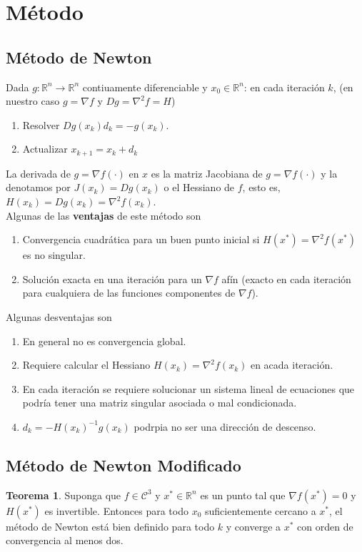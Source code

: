 \documentclass[11pt,letterpaper]{article}
\theoremstyle{definition}
\theoremstyle{definition}
\newtheorem{teo}{Teorema}[section]%
\theoremstyle{definition}
\begin{document}
\section{Método}
\subsection{Método de Newton}
Dada $ g: \mathbb{R}^n \to \mathbb{R}^n $ contiuamente diferenciable y $ x_0\in \mathbb{R}^n $: en cada iteración $ k $, (en nuestro caso $ g = \nabla f $ y $ Dg = \nabla^2 f = H $)
\begin{enumerate}
	\item Resolver $ D g (x_k) d_k = - g(x_k) $.
	\item Actualizar $ x_{k+1} = x_k + d_k $
\end{enumerate}
La derivada de $ g = \nabla f(\cdot) $ en $ x $ es la matriz Jacobiana de $ g = \nabla f(\cdot) $ y la denotamos por $ J(x_k) = D g (x_k) $ o el Hessiano de $ f $, esto es, $ H(x_k) = Dg(x_k) = \nabla^2 f (x_k) $.
\\
Algunas de las \textbf{ventajas} de este método son
\begin{shaded*}
	\begin{enumerate}
		\item Convergencia cuadrática para un buen punto inicial si $ H(x^*) = \nabla^2 f(x^*) $ es no singular.
		\item  Solución exacta en una iteración para un $ \nabla f $ afín (exacto en cada iteración para cualquiera de las funciones componentes de $ \nabla f $).
	\end{enumerate}
\end{shaded*}
Algunas desventajas son
\begin{shaded*}
	\begin{enumerate}
		\item En general no es convergencia global.
		\item  Requiere calcular el Hessiano $ H(x_k) = \nabla^2 f(x_k) $ en acada iteración.
		\item En cada iteración se requiere solucionar un sistema lineal de ecuaciones que podría tener una matriz singular asociada o mal condicionada.
		\item $ d_k = - H(x_k)^{-1} g(x_k) $ podrpia no ser una dirección de descenso.
	\end{enumerate}
\end{shaded*}

\subsection{Método de Newton Modificado}
\begin{shaded*}
\begin{teo}
	Suponga que $ f \in \mathcal{C}^3 $ y $ x^* \in \mathbb{R}^n $ es un punto tal que $ \nabla f(x^*) = 0 $ y $  H(x^*) $ es invertible. Entonces para todo $ x_0 $ suficientemente cercano a $ x^* $, el método de Newton está bien definido para todo $ k $ y converge a $ x^* $ con orden de convergencia al menos dos.
\end{teo} 
\end{shaded*}
\end{document}
